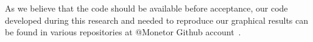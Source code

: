 As we believe that the code should be available before acceptance, our code developed during this research and needed to reproduce our graphical results can be found in various repositories at @Monetor Github account~\cite{monetor-github}.